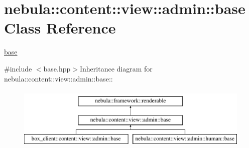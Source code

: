 \hypertarget{classnebula_1_1content_1_1view_1_1admin_1_1base}{
\section{nebula::content::view::admin::base Class Reference}
\label{classnebula_1_1content_1_1view_1_1admin_1_1base}
}


\hyperlink{classnebula_1_1content_1_1view_1_1admin_1_1base}{base}  


{\ttfamily \#include $<$base.hpp$>$}Inheritance diagram for nebula::content::view::admin::base::\begin{figure}[H]
\begin{center}
\leavevmode
\includegraphics[height=3cm]{classnebula_1_1content_1_1view_1_1admin_1_1base}
\end{center}
\end{figure}
